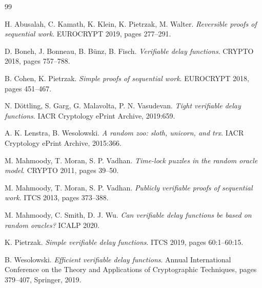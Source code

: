 \documentclass{aicr-conjecture}
\begin{document}
\begin{aicrbibliography}{99}

H. Abusalah, C. Kamath, K. Klein, K. Pietrzak, M. Walter.
\emph{Reversible proofs of sequential work}.
EUROCRYPT 2019, pages 277--291.

D. Boneh, J. Bonneau, B. B\"unz, B. Fisch.
\emph{Verifiable delay functions}.
CRYPTO 2018, pages 757--788.

B. Cohen, K. Pietrzak.
\emph{Simple proofs of sequential work}.
EUROCRYPT 2018, pages 451--467.

N. D\"ottling, S. Garg, G. Malavolta, P. N. Vasudevan.
\emph{Tight verifiable delay functions}.
IACR Cryptology ePrint Archive, 2019:659.

A. K. Lenstra, B. Wesolowski.
\emph{A random zoo: sloth, unicorn, and trx}.
IACR Cryptology ePrint Archive, 2015:366.

M. Mahmoody, T. Moran, S. P. Vadhan.
\emph{Time-lock puzzles in the random oracle model}.
CRYPTO 2011, pages 39--50.

M. Mahmoody, T. Moran, S. P. Vadhan.
\emph{Publicly verifiable proofs of sequential work}.
ITCS 2013, pages 373--388.

M. Mahmoody, C. Smith, D. J. Wu.
\emph{Can verifiable delay functions be based on random oracles?}
ICALP 2020.

K. Pietrzak.
\emph{Simple verifiable delay functions}.
ITCS 2019, pages 60:1--60:15.

B. Wesolowski.
\emph{Efficient verifiable delay functions}.
Annual International Conference on the Theory and Applications of
Cryptographic Techniques, pages 379--407, Springer, 2019.

\end{aicrbibliography}
\end{document}
